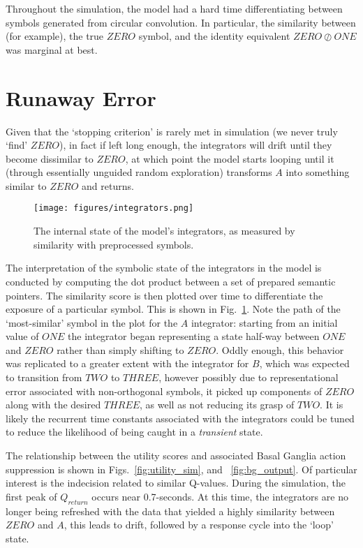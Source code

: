 \documentclass{report}
\begin{document}
Throughout the simulation, the model had a hard time differentiating between symbols generated from circular convolution.
In particular, the similarity between (for example), the true $ZERO$ symbol, and the identity equivalent $ZERO \oslash ONE$ was marginal at best.

\section{Runaway Error}
Given that the \lq{}stopping criterion\rq{} is rarely met in simulation (we never truly \lq{}find\rq{} $ZERO$), in fact if left long enough, the integrators will drift until they become dissimilar to $ZERO$, at which point the model starts looping until it (through essentially unguided random exploration) transforms $A$ into something similar to $ZERO$ and returns.

\begin{figure}[H]
\centering
\texttt{[image: figures/integrators.png]}
\caption{The internal state of the model\rq{}s integrators, as measured by similarity with preprocessed symbols.}
\label{fig:integrators}
\end{figure}

The interpretation of the symbolic state of the integrators in the model is conducted by computing the dot product between a set of prepared semantic pointers.
The similarity score is then plotted over time to differentiate the exposure of a particular symbol.
This is shown in Fig.~\ref{fig:integrators}.
Note the path of the \lq{}most-similar\rq{} symbol in the plot for the $A$ integrator: starting from an initial value of $ONE$ the integrator began representing a state half-way between $ONE$ and $ZERO$ rather than simply shifting to $ZERO$.
Oddly enough, this behavior was replicated to a greater extent with the integrator for $B$, which was expected to transition from $TWO$ to $THREE$, however possibly due to representational error associated with non-orthogonal symbols, it picked up components of $ZERO$ along with the desired $THREE$, as well as not reducing its grasp of $TWO$.
It is likely the recurrent time constants associated with the integrators could be tuned to reduce the likelihood of being caught in a \emph{transient} state.

The relationship between the utility scores and associated Basal Ganglia action suppression is shown in Figs.~\ref{fig:utility_sim}, and ~\ref{fig:bg_output}.
Of particular interest is the indecision related to similar Q-values.
During the simulation, the first peak of $Q_{return}$ occurs near 0.7-seconds.
At this time, the integrators are no longer being refreshed with the data that yielded a highly similarity between $ZERO$ and $A$, this leads to drift, followed by a response cycle into the \lq{}loop\rq{} state.
\end{document}
